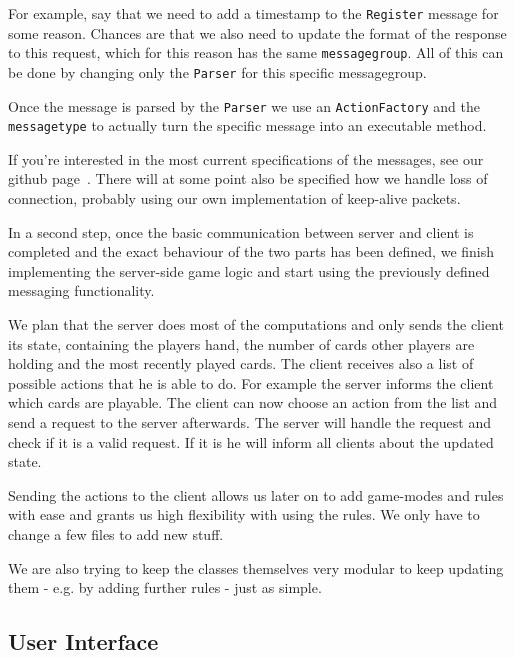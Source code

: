 \documentclass{sig-alternate}
\begin{document}
For example, say that we need to add a timestamp to the \verb|Register| message for some reason. Chances are that we also need to update the format of the response to this request, which for this reason has the same \verb|messagegroup|. All of this can be done by changing only the \verb|Parser| for this specific messagegroup.

Once the message is parsed by the \verb|Parser| we use an \verb|ActionFactory| and the \verb|messagetype| to actually turn the specific message into an executable method.

If you're interested in the most current specifications of the messages, see our github page~\cite{github}. There will at some point also be specified how we handle loss of connection, probably using our own implementation of keep-alive packets.

In a second step, once the basic communication between server and client is completed and the exact behaviour of the two parts has been defined, we finish implementing the server-side game logic and start using the previously defined messaging functionality.

We plan that the server does most of the computations and only sends the client its state, containing the players hand, the number of cards other players are holding and the most recently played cards. The client receives also a list of possible actions that he is able to do. For example the server informs the client which cards are playable. The client can now choose an action from the list and send a request to the server afterwards. The server will handle the request and check if it is a valid request. If it is he will inform all clients about the updated state.

Sending the actions to the client allows us later on to add game-modes and rules with ease and grants us high flexibility with using the rules. We only have to change a few files to add new stuff.

We are also trying to keep the classes themselves very modular to keep updating them - e.g. by adding further rules - just as simple.

\subsection{User Interface}
\end{document}
